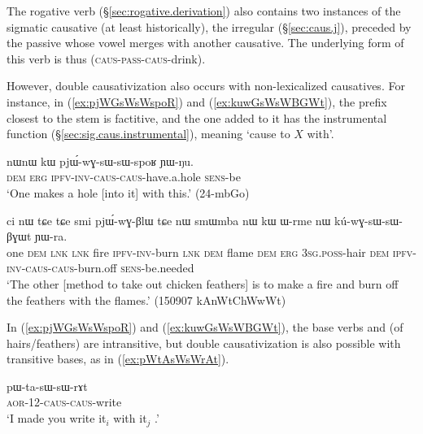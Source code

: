 The rogative verb   (§\ref{sec:rogative.derivation}) also contains two instances of the sigmatic causative (at least historically), the irregular  (§\ref{sec:caus.j}), preceded by the passive  whose vowel merges with another causative. The underlying form of this verb is thus  (\textsc{caus}-\textsc{pass}-\textsc{caus}-drink).

However, double causativization also occurs with non-lexicalized causatives. For instance, in (\ref{ex:pjWGsWsWspoR}) and (\ref{ex:kuwGsWsWBGWt}), the  prefix closest to the stem is factitive, and the one added to it has the instrumental function (§\ref{sec:sig.caus.instrumental}), meaning  `cause to $X$ with'. 

\begin{exe}
\ex \label{ex:pjWGsWsWspoR}
\gll nɯnɯ kɯ pjɯ́-wɣ-sɯ-sɯ-spoʁ ɲɯ-ŋu. \\
\textsc{dem} \textsc{erg} \textsc{ipfv}-\textsc{inv}-\textsc{caus}-\textsc{caus}-have.a.hole \textsc{sens}-be \\
\glt `One makes a hole [into it] with this.' (24-mbGo) 
 \end{exe} 
 
\begin{exe}
\ex \label{ex:kuwGsWsWBGWt}
\gll ci nɯ tɕe tɕe smi pjɯ́-wɣ-βlɯ tɕe nɯ smɯmba nɯ kɯ ɯ-rme nɯ kú-wɣ-sɯ-sɯ-βɣɯt ɲɯ-ra. \\
one \textsc{dem} \textsc{lnk} \textsc{lnk} fire \textsc{ipfv}-\textsc{inv}-burn \textsc{lnk} \textsc{dem} flame \textsc{dem} \textsc{erg} \textsc{3sg}.\textsc{poss}-hair \textsc{dem} \textsc{ipfv}-\textsc{inv}-\textsc{caus}-\textsc{caus}-burn.off \textsc{sens}-be.needed \\
\glt `The other [method to take out chicken feathers] is to make a fire and burn off the feathers with the flames.' (150907 kAnWtChWwWt)
 \end{exe} 
 
 In (\ref{ex:pjWGsWsWspoR}) and (\ref{ex:kuwGsWsWBGWt}), the base verbs  and  (of hairs/feathers) are intransitive, but double causativization is also possible with transitive bases, as in (\ref{ex:pWtAsWsWrAt}).
 
 \begin{exe}
\ex \label{ex:pWtAsWsWrAt}
\gll  pɯ-ta-sɯ-sɯ-rɤt \\
\textsc{aor}-1\fl{}2-\textsc{caus}-\textsc{caus}-write \\
\glt `I made you write it$_i$ with it$_j$ .' 
  \end{exe} 

